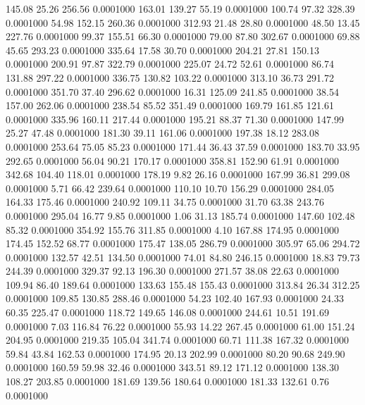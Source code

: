  145.08   25.26  256.56   0.0001000
 163.01  139.27   55.19   0.0001000
 100.74   97.32  328.39   0.0001000
  54.98  152.15  260.36   0.0001000
 312.93   21.48   28.80   0.0001000
  48.50   13.45  227.76   0.0001000
  99.37  155.51   66.30   0.0001000
  79.00   87.80  302.67   0.0001000
  69.88   45.65  293.23   0.0001000
 335.64   17.58   30.70   0.0001000
 204.21   27.81  150.13   0.0001000
 200.91   97.87  322.79   0.0001000
 225.07   24.72   52.61   0.0001000
  86.74  131.88  297.22   0.0001000
 336.75  130.82  103.22   0.0001000
 313.10   36.73  291.72   0.0001000
 351.70   37.40  296.62   0.0001000
  16.31  125.09  241.85   0.0001000
  38.54  157.00  262.06   0.0001000
 238.54   85.52  351.49   0.0001000
 169.79  161.85  121.61   0.0001000
 335.96  160.11  217.44   0.0001000
 195.21   88.37   71.30   0.0001000
 147.99   25.27   47.48   0.0001000
 181.30   39.11  161.06   0.0001000
 197.38   18.12  283.08   0.0001000
 253.64   75.05   85.23   0.0001000
 171.44   36.43   37.59   0.0001000
 183.70   33.95  292.65   0.0001000
  56.04   90.21  170.17   0.0001000
 358.81  152.90   61.91   0.0001000
 342.68  104.40  118.01   0.0001000
 178.19    9.82   26.16   0.0001000
 167.99   36.81  299.08   0.0001000
   5.71   66.42  239.64   0.0001000
 110.10   10.70  156.29   0.0001000
 284.05  164.33  175.46   0.0001000
 240.92  109.11   34.75   0.0001000
  31.70   63.38  243.76   0.0001000
 295.04   16.77    9.85   0.0001000
   1.06   31.13  185.74   0.0001000
 147.60  102.48   85.32   0.0001000
 354.92  155.76  311.85   0.0001000
   4.10  167.88  174.95   0.0001000
 174.45  152.52   68.77   0.0001000
 175.47  138.05  286.79   0.0001000
 305.97   65.06  294.72   0.0001000
 132.57   42.51  134.50   0.0001000
  74.01   84.80  246.15   0.0001000
  18.83   79.73  244.39   0.0001000
 329.37   92.13  196.30   0.0001000
 271.57   38.08   22.63   0.0001000
 109.94   86.40  189.64   0.0001000
 133.63  155.48  155.43   0.0001000
 313.84   26.34  312.25   0.0001000
 109.85  130.85  288.46   0.0001000
  54.23  102.40  167.93   0.0001000
  24.33   60.35  225.47   0.0001000
 118.72  149.65  146.08   0.0001000
 244.61   10.51  191.69   0.0001000
   7.03  116.84   76.22   0.0001000
  55.93   14.22  267.45   0.0001000
  61.00  151.24  204.95   0.0001000
 219.35  105.04  341.74   0.0001000
  60.71  111.38  167.32   0.0001000
  59.84   43.84  162.53   0.0001000
 174.95   20.13  202.99   0.0001000
  80.20   90.68  249.90   0.0001000
 160.59   59.98   32.46   0.0001000
 343.51   89.12  171.12   0.0001000
 138.30  108.27  203.85   0.0001000
 181.69  139.56  180.64   0.0001000
 181.33  132.61    0.76   0.0001000
